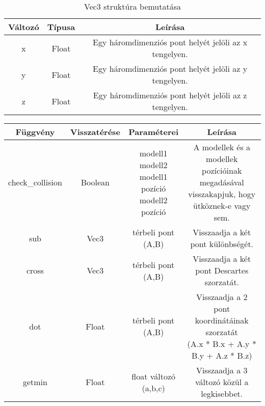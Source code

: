 \begin{table}[h]
	\centering
	\begin{tabular}{|c|c|c|}
		\hline
		\textbf{Változó}     & \textbf{Típusa}& \textbf{Leírása}\\ \hline
		x&Float&Egy háromdimenziós pont helyét jelöli az x tengelyen.\\ \hline
		y&Float&Egy háromdimenziós pont helyét jelöli az y tengelyen.\\ \hline
		z&Float&Egy háromdimenziós pont helyét jelöli az z tengelyen.\\ \hline
		
	\end{tabular}
	\caption{Vec3 struktúra bemutatása}
	\label{tab:strukt}
\end{table}

\begin{table}[h]
	\centering
	\begin{tabular}{|c|c|c|c|}
		\hline
		\textbf{Függvény} & \textbf{Visszatérése}    & \textbf{Paraméterei}& \textbf{Leírása}\\ \hline
		
		check\_collision&Boolean&\parbox{2.7cm}{\centering modell1\\modell2\\modell1 pozíció\\modell2 pozíció}&\parbox{4.3cm}{\centering A modellek és a modellek pozícióinak megadásával visszakapjuk, hogy ütköznek-e vagy sem.}\\ \hline
		
		sub&Vec3&\parbox{2.7cm}{ térbeli pont\\(A,B)}&\parbox{4.3cm}{\centering Visszaadja a két pont különbségét.}\\ \hline
		
		cross&Vec3&\parbox{2.7cm}{ térbeli pont\\(A,B)}&\parbox{4.3cm}{\centering Visszaadja a két pont Descartes szorzatát.}\\ \hline
		
		dot&Float&\parbox{2.7cm}{ térbeli pont\\(A,B)}&\parbox{4.3cm}{\centering Visszaadja a 2 pont koordinátáinak szorzatát\\(A.x * B.x + A.y * B.y + A.z * B.z)}\\ \hline
		
		getmin&Float&\parbox{2.7cm}{ float változó\\(a,b,c)}&\parbox{4.3cm}{\centering Visszaadja a 3 változó közül a legkisebbet.}\\ \hline
		

\end{tabular}
\end{table}
